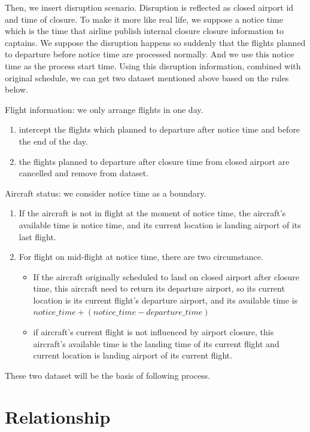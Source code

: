 \documentclass[senior]{IPSstyle}
\begin{document}
Then, we insert disruption scenario. Disruption is reflected as closed airport id and time of closure. To make it more like real life, we suppose a notice time which is the time that airline publish internal closure closure information to captains. We suppose the disruption happens so suddenly that the flights planned to departure before notice time are processed normally. And we use this notice time as the process start time. Using this disruption information, combined with original schedule,  we can get two dataset mentioned above based on the rules below.

Flight information: we only arrange flights in one day.
\begin{enumerate}
    \item intercept the flights which planned to departure after notice time and before the end of the day.
    \item the flights planned to departure after closure time from closed airport are cancelled and remove from dataset.
\end{enumerate}

Aircraft status: we consider notice time as a boundary. 
\begin{enumerate}
    \item If the aircraft is not in flight at the moment of notice time, the aircraft’s available time is notice time, and its current location is landing airport of its last flight. 
    \item For flight on mid-flight at notice time, there are two circumstance.
    \begin{itemize}
        \item If the aircraft originally scheduled to land on closed airport after closure time, this aircraft need to return its departure airport, so its current location is its current flight’s departure airport, and its available time is $notice\_time+ (notice\_time - departure\_time)$
        \item if aircraft’s current flight is not influenced by airport closure, this aircraft’s available time is the landing time of its current flight and current location is landing airport of its current flight.
    \end{itemize}
\end{enumerate}
These two dataset will be the basis of following process.

\section{Relationship}\label{Section4.2}
\end{document}
